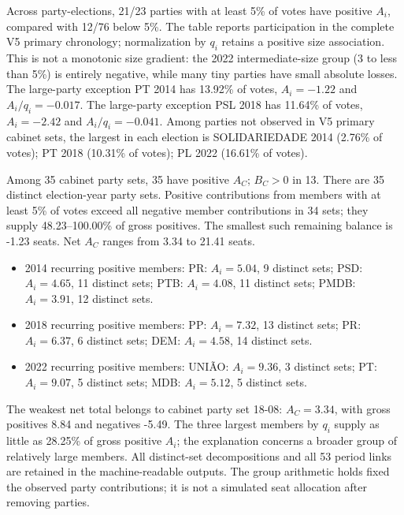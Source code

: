 Across party-elections, 21/23 parties with at least 5\% of votes have positive \(A_i\), compared with 12/76 below 5\%. The table reports participation in the complete V5 primary chronology; normalization by \(q_i\) retains a positive size association. This is not a monotonic size gradient: the 2022 intermediate-size group (3 to less than 5\%) is entirely negative, while many tiny parties have small absolute losses.
The large-party exception PT 2014 has 13.92\% of votes, \(A_i=-1.22\) and \(A_i/q_i=-0.017\).
The large-party exception PSL 2018 has 11.64\% of votes, \(A_i=-2.42\) and \(A_i/q_i=-0.041\).
Among parties not observed in V5 primary cabinet sets, the largest in each election is SOLIDARIEDADE 2014 (2.76\% of votes); PT 2018 (10.31\% of votes); PL 2022 (16.61\% of votes).
\par Among 35 cabinet party sets, 35 have positive \(A_C\); \(B_C>0\) in 13. There are 35 distinct election-year party sets. Positive contributions from members with at least 5\% of votes exceed all negative member contributions in 34 sets; they supply 48.23--100.00\% of gross positives. The smallest such remaining balance is -1.23 seats. Net \(A_C\) ranges from 3.34 to 21.41 seats.
\begin{itemize}
\item 2014 recurring positive members: PR: \(A_i=5.04\), 9 distinct sets; PSD: \(A_i=4.65\), 11 distinct sets; PTB: \(A_i=4.08\), 11 distinct sets; PMDB: \(A_i=3.91\), 12 distinct sets.
\item 2018 recurring positive members: PP: \(A_i=7.32\), 13 distinct sets; PR: \(A_i=6.37\), 6 distinct sets; DEM: \(A_i=4.58\), 14 distinct sets.
\item 2022 recurring positive members: UNIÃO: \(A_i=9.36\), 3 distinct sets; PT: \(A_i=9.07\), 5 distinct sets; MDB: \(A_i=5.12\), 5 distinct sets.
\end{itemize}
The weakest net total belongs to cabinet party set 18-08: \(A_C=3.34\), with gross positives 8.84 and negatives -5.49. The three largest members by \(q_i\) supply as little as 28.25\% of gross positive \(A_i\); the explanation concerns a broader group of relatively large members. All distinct-set decompositions and all 53 period links are retained in the machine-readable outputs. The group arithmetic holds fixed the observed party contributions; it is not a simulated seat allocation after removing parties.
